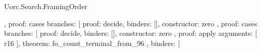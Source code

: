 \begin{lexlean}{Uorc.Search.FramingOrder}
\begin{semanticmodule}
{{{{{{{{{{{{{{{{{{{{{{{{{{{{{                                                                                    },
                                                                                    {
                                                                                      proof: cases{
                                                                                        branches: [
                                                                                          {
                                                                                            proof: decide{},
                                                                                            binders: [],
                                                                                            constructor: zero
                                                                                          },
                                                                                          {
                                                                                            proof: cases{
                                                                                              branches: [
                                                                                                {
                                                                                                  proof: decide{},
                                                                                                  binders: [],
                                                                                                  constructor: zero
                                                                                                },
                                                                                                {
                                                                                                  proof: apply{
                                                                                                    arguments: [
                                                                                                      r16
                                                                                                    ],
                                                                                                    theorem: fo_count_terminal_from_96
                                                                                                  },
                                                                                                  binders: [
}}}}}}}}}}}}}}}}}}}}}}}}}}}}}}}}}
\end{semanticmodule}
\end{lexlean}
